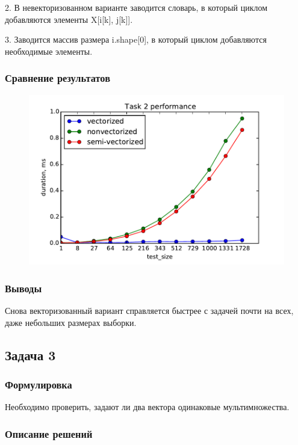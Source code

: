 \documentclass[12pt]{article}
\begin{document}
2. В невекторизованном варианте заводится словарь, в который циклом добавляются элементы X[i[k], j[k]].

3. Заводится массив размера i.shape[0], в который циклом добавляются необходимые элементы.

\subsubsection*{Сравнение результатов}

\begin{figure}[h]
	\begin{center}
		\includegraphics[scale=0.7]{task2}
	\end{center}
\end{figure}

\subsubsection*{Выводы}

Снова векторизованный вариант справляется быстрее с задачей почти на всех, даже небольших размерах выборки.

\subsection{Задача 3}

\subsubsection*{Формулировка}

Необходимо проверить, задают ли два вектора одинаковые мультимножества.

\subsubsection*{Описание решений}
\end{document}
